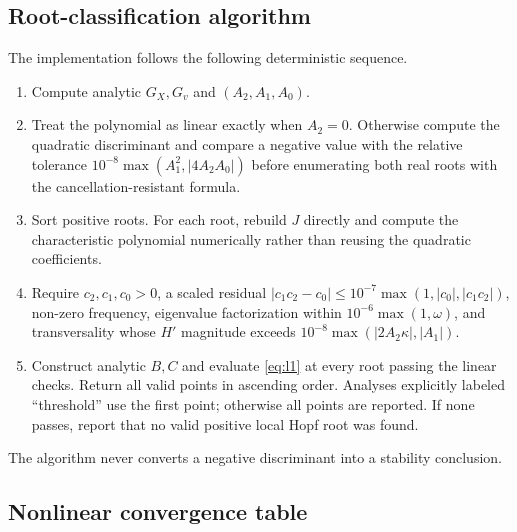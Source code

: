\documentclass[11pt]{article}
\begin{document}
\subsection{Root-classification algorithm}

The implementation follows the following deterministic sequence.
\begin{enumerate}
\item Compute analytic $G_X,G_v$ and $(A_2,A_1,A_0)$.
\item Treat the polynomial as linear exactly when $A_2=0$.  Otherwise compute the
quadratic discriminant and compare a negative value with the relative tolerance
$10^{-8}\max(A_1^2,|4A_2A_0|)$ before enumerating both real roots with the
cancellation-resistant formula.
\item Sort positive roots.  For each root, rebuild $J$ directly and compute the characteristic
polynomial numerically rather than reusing the quadratic coefficients.
\item Require $c_2,c_1,c_0>0$, a scaled residual
$|c_1c_2-c_0|\leq10^{-7}\max(1,|c_0|,|c_1c_2|)$, non-zero frequency, eigenvalue
factorization within $10^{-6}\max(1,\omega)$, and transversality whose $H'$ magnitude
exceeds $10^{-8}\max(|2A_2\kappa|,|A_1|)$.
\item Construct analytic $B,C$ and evaluate \cref{eq:l1} at every root passing the linear
checks.  Return all valid points in ascending order.  Analyses explicitly labeled
``threshold'' use the first point; otherwise all points are reported.  If none passes,
report that no valid positive local Hopf root was found.
\end{enumerate}
The algorithm never converts a negative discriminant into a stability conclusion.

\subsection{Nonlinear convergence table}
\end{document}
